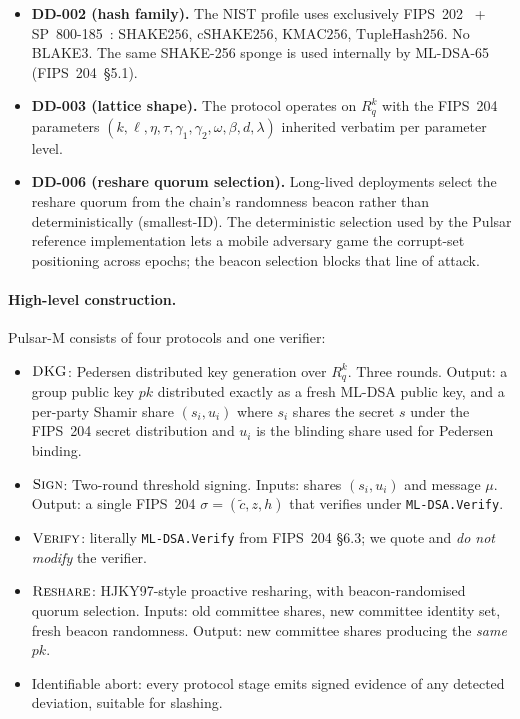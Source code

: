 \documentclass[11pt,a4paper]{article}
\theoremstyle{definition}
\theoremstyle{remark}
\newcommand{\Rq}{R_q}
\newcommand{\SHAKE}{\mathrm{SHAKE256}}
\newcommand{\cSHAKE}{\mathrm{cSHAKE256}}
\newcommand{\KMAC}{\mathrm{KMAC256}}
\newcommand{\TupleHash}{\mathrm{TupleHash256}}
\newcommand{\Sign}{\textsc{Sign}}
\newcommand{\Verify}{\textsc{Verify}}
\newcommand{\DKG}{\textsc{DKG}}
\newcommand{\Reshare}{\textsc{Reshare}}
\begin{document}
\begin{itemize}[leftmargin=*]
\item \textbf{DD-002 (hash family).} The NIST profile uses
exclusively FIPS~202~\cite{nist-fips202} +
SP~800-185~\cite{nist-sp800-185}: $\SHAKE$, $\cSHAKE$, $\KMAC$,
$\TupleHash$. No BLAKE3. The same SHAKE-256 sponge is used
internally by ML-DSA-65 (FIPS~204~\S5.1).
\item \textbf{DD-003 (lattice shape).} The protocol operates on
$\Rq^k$ with the FIPS~204 parameters $(k, \ell, \eta, \tau, \gamma_1,
\gamma_2, \omega, \beta, d, \lambda)$ inherited verbatim per
parameter level.
\item \textbf{DD-006 (reshare quorum selection).} Long-lived
deployments select the reshare quorum from the chain's randomness
beacon rather than deterministically (smallest-ID). The deterministic
selection used by the Pulsar reference implementation lets a mobile
adversary game the corrupt-set positioning across epochs; the beacon
selection blocks that line of attack.
\end{itemize}

\paragraph{High-level construction.}
Pulsar-M consists of four protocols and one verifier:

\begin{itemize}[leftmargin=*]
\item $\DKG$: Pedersen distributed key generation over $\Rq^k$.
Three rounds. Output: a group public key $\mathit{pk}$ distributed
exactly as a fresh ML-DSA public key, and a per-party Shamir share
$(s_i, u_i)$ where $s_i$ shares the secret $s$ under the FIPS~204
secret distribution and $u_i$ is the blinding share used for
Pedersen binding.
\item $\Sign$: Two-round threshold signing. Inputs: shares
$(s_i, u_i)$ and message $\mu$. Output: a single FIPS~204
$\sigma = (\tilde c, z, h)$ that verifies under \texttt{ML-DSA.Verify}.
\item $\Verify$: literally \texttt{ML-DSA.Verify} from FIPS~204
\S6.3; we quote and \emph{do not modify} the verifier.
\item $\Reshare$: HJKY97-style proactive resharing, with
beacon-randomised quorum selection. Inputs: old committee shares,
new committee identity set, fresh beacon randomness.
Output: new committee shares producing the \emph{same} $\mathit{pk}$.
\item Identifiable abort: every protocol stage emits signed evidence
of any detected deviation, suitable for slashing.
\end{itemize}
\end{document}
